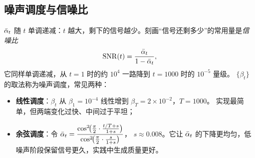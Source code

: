 \subsection{噪声调度与信噪比}

$\bar{\alpha}_t$ 随 $t$ 单调递减：$t$ 越大，剩下的信号越少。刻画“信号还剩多少”的常用量是\emph{信噪比}
\begin{equation}
  \mathrm{SNR}(t)=\frac{\bar{\alpha}_t}{1-\bar{\alpha}_t},
  \label{eq:snr}
\end{equation}
它同样单调递减，从 $t=1$ 时的约 $10^4$ 一路降到 $t=1000$ 时的 $10^{-5}$ 量级。
$\{\beta_t\}$ 的取法称为噪声调度，常见两种\cite{ho2020ddpm,nichol2021improved}：

\begin{itemize}
  \item \textbf{线性调度}：$\beta_t$ 从 $\beta_1=10^{-4}$ 线性增到 $\beta_T=2\times10^{-2}$，$T=1000$。
        实现最简单，但两端变化过快、中间过于平坦；
  \item \textbf{余弦调度}：令
        $\bar{\alpha}_t=\dfrac{\cos^2\!\bigl(\frac{\pi}{2}\cdot\frac{t/T+s}{1+s}\bigr)}{\cos^2\!\bigl(\frac{\pi}{2}\cdot\frac{s}{1+s}\bigr)}$，
        $s\approx 0.008$。它让 $\bar{\alpha}_t$ 的下降更均匀，低噪声阶段保留信号更久，实践中生成质量更好。
\end{itemize}

